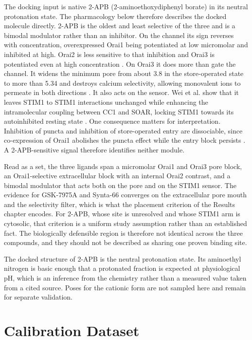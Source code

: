 The docking input is native 2-APB (2-aminoethoxydiphenyl borate) in its neutral protonation state. The pharmacology below therefore describes the docked molecule directly. 2-APB is the oldest and least selective of the three and is a bimodal modulator rather than an inhibitor. On the channel its sign reverses with concentration, overexpressed Orai1 being potentiated at low micromolar and inhibited at high. Orai2 is less sensitive to that inhibition and Orai3 is potentiated even at high concentration \cite{ref070}. On Orai3 it does more than gate the channel. It widens the minimum pore from about 3.8\angstrom{} in the store-operated state to more than 5.34\angstrom{} and destroys calcium selectivity, allowing monovalent ions to permeate in both directions \cite{ref092}. It also acts on the sensor. Wei et al. show that it leaves STIM1 to STIM1 interactions unchanged while enhancing the intramolecular coupling between CC1 and SOAR, locking STIM1 towards its autoinhibited resting state \cite{ref040}. One consequence matters for interpretation. Inhibition of puncta and inhibition of store-operated entry are dissociable, since co-expression of Orai1 abolishes the puncta effect while the entry block persists \cite{ref040}. A 2-APB-sensitive signal therefore identifies neither module.

Read as a set, the three ligands span a micromolar Orai1 and Orai3 pore block, an Orai1-selective extracellular block with an internal Orai2 contrast, and a bimodal modulator that acts both on the pore and on the STIM1 sensor. The evidence for GSK-7975A and Synta-66 converges on the extracellular pore mouth and the selectivity filter, which is what the placement criterion of the Results chapter encodes. For 2-APB, whose site is unresolved and whose STIM1 arm is cytosolic, that criterion is a uniform study assumption rather than an established fact. The biologically defensible region is therefore not identical across the three compounds, and they should not be described as sharing one proven binding site.

The docked structure of 2-APB is the neutral protonation state. Its aminoethyl nitrogen is basic enough that a protonated fraction is expected at physiological pH, which is an inference from the chemistry rather than a measured value taken from a cited source. Poses for the cationic form are not sampled here and remain for separate validation.

\hypertarget{dataset}{%
\chapter{Calibration Dataset}\label{dataset}}

